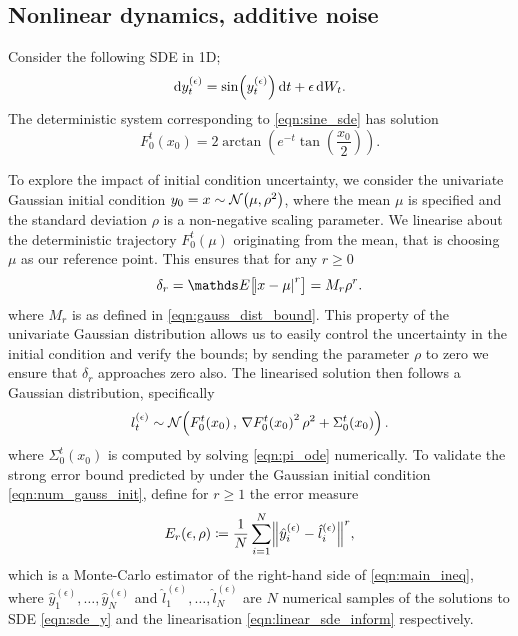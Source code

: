\subsection{Nonlinear dynamics, additive noise}\label{sec:numerics_nonlinear}
Consider the following SDE in 1D;
\begin{equation}\label{eqn:sine_sde}
	\dif y_t^{(\epsilon)} = \sin\!\left(y_t^{(\epsilon)}\right)\dif t + \epsilon \dif W_t.
\end{equation}
The deterministic system corresponding to \eqref{eqn:sine_sde} has solution
\[
	F_0^t\!\left(x_0\right) = 2\arctan\left(e^{-t}\tan\left(\frac{x_0}{2}\right)\right).
\]

To explore the impact of initial condition uncertainty, we consider the univariate Gaussian initial condition \(y_0 = x \sim \mathcal{N}\!\left(\mu, \rho^2\right)\), where the mean \(\mu\) is specified and the standard deviation \(\rho\) is a non-negative scaling parameter.
We linearise about the deterministic trajectory \(F_0^t\!\left(\mu\right)\) originating from the mean, that is choosing \(\mu\) as our reference point.
This ensures that for any \(r \geq 0\)
\begin{equation}\label{eqn:num_gauss_init}
    \delta_r = \avg{\abs{x - \mu}^r} = M_r \rho^r.
\end{equation}
where \(M_r\) is as defined in \eqref{eqn:gauss_dist_bound}.
This property of the univariate Gaussian distribution allows us to easily control the uncertainty in the initial condition and verify the bounds; by sending the parameter \(\rho\) to zero we ensure that \(\delta_r\) approaches zero also.
The linearised solution then follows a Gaussian distribution, specifically
\begin{equation}\label{eqn:num_linear_sol}
	l_t^{(\epsilon)} \sim\mathcal{N}\!\left(F_0^t\!\left(x_0\right), \, \nabla F_0^t\!\left(x_0\right)^2\rho^2 + \Sigma_0^t\!\left(x_0\right)\right).
\end{equation}
where \(\Sigma_0^t\!\left(x_0\right)\) is computed by solving \eqref{eqn:pi_ode} numerically.
To validate the strong error bound predicted by  under the Gaussian initial condition \eqref{eqn:num_gauss_init}, define for \(r \geq 1\) the error measure
\begin{equation}
	E_r\!\left(\epsilon, \rho\right) \coloneqq \frac{1}{N}\sum_{i=1}^N{\norm{\hat{y}_{i}^{(\epsilon)} - \hat{l}_i^{(\epsilon)}}^r},
	\label{eqn:strong_err_mc_estimate}
\end{equation}
which is a Monte-Carlo estimator of the right-hand side of \eqref{eqn:main_ineq}, where \(\hat{y}_1^{(\epsilon)},\dotsc, \hat{y}_N^{(\epsilon)}\) and \(\hat{l}_1^{(\epsilon)},\dotsc, \hat{l}_N^{(\epsilon)}\) are \(N\) numerical samples of the solutions to SDE \eqref{eqn:sde_y} and the linearisation \eqref{eqn:linear_sde_inform} respectively.

